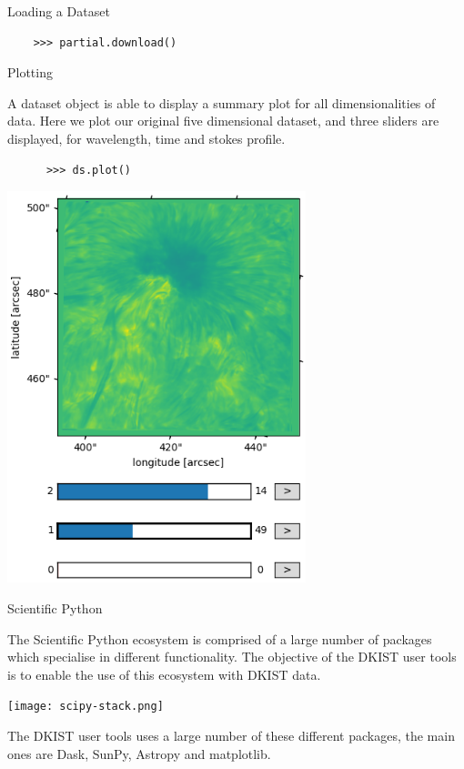 \documentclass[landscape,a0paper,fontscale=0.32]{baposter}
\begin{document}
\begin{poster}
\begin{posterbox}[name=dataset,column=2,row=0,span=2]{Loading a Dataset}
  \begin{verbatim}
    >>> partial.download()
  \end{verbatim}

  
\end{posterbox}

\begin{posterbox}[name=scipy,column=2,row=0,span=1,below=dataset]{Plotting}

  A dataset object is able to display a summary plot for all dimensionalities of
  data. Here we plot our original five dimensional dataset, and three sliders
  are displayed, for wavelength, time and stokes profile.

  \begin{verbatim}
      >>> ds.plot()
  \end{verbatim}

  \begin{center}
    \includegraphics[width=0.65\textwidth]{5d-animator.png}
  \end{center}
  
\end{posterbox}

\begin{posterbox}[name=scipy,column=3,row=0,span=1,below=dataset]{Scientific Python}

  The Scientific Python ecosystem is comprised of a large number of packages
  which specialise in different functionality. The objective of the DKIST user
  tools is to enable the use of this ecosystem with DKIST data.
  
  \texttt{[image: scipy-stack.png]}

  The DKIST user tools uses a large number of these different packages, the main
  ones are Dask, SunPy, Astropy and matplotlib.

\end{posterbox}

\end{poster}
\end{document}
